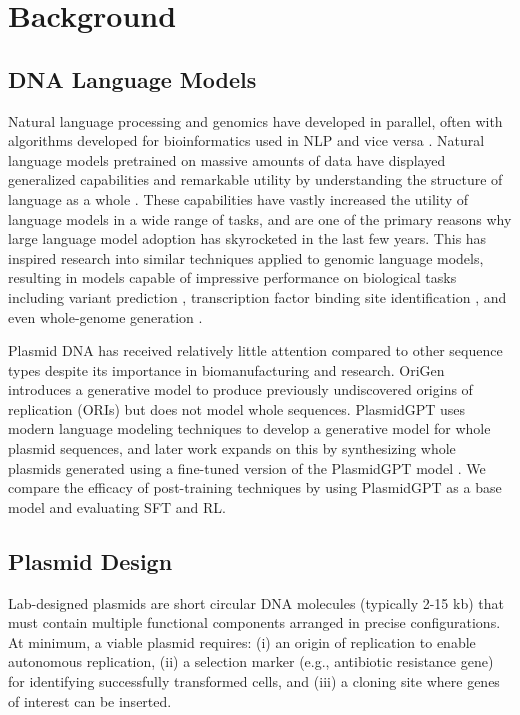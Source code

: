 \documentclass{article}
\theoremstyle{plain}
\theoremstyle{definition}
\theoremstyle{remark}
\begin{document}
\section{Background}

\subsection{DNA Language Models}

Natural language processing and genomics have developed in parallel,
often with algorithms developed for bioinformatics used in NLP and vice
versa \cite{durbin}. Natural language models pretrained on massive
amounts of data have displayed generalized capabilities and remarkable
utility by understanding the structure of language as a whole \cite{emergent_abilities_of_large_language_models}. 
These capabilities have vastly increased the utility of language models 
in a wide range of tasks, and are one of the primary reasons why 
large language model adoption has skyrocketed in the last few years.
This has inspired research into similar techniques applied to 
genomic language models, resulting in models capable of impressive performance on
biological tasks including variant prediction \cite{dnabert},
transcription factor binding site identification \cite{hyenadna}, and
even whole-genome generation \cite{evo}.

Plasmid DNA has received relatively little attention compared to other
sequence types despite its importance in biomanufacturing and 
research. OriGen \cite{origen} introduces a generative model to produce
previously undiscovered origins of replication (ORIs) but does not model
whole sequences. PlasmidGPT \cite{plasmidgpt, angus} uses modern language
modeling techniques to develop a generative model for whole plasmid
sequences, and later work expands on this by synthesizing whole plasmids
generated using a fine-tuned version of the PlasmidGPT model
\cite{angus}. We compare the efficacy of post-training techniques by
using PlasmidGPT as a base model and evaluating SFT and RL.

\subsection{Plasmid Design}

Lab-designed plasmids are short circular DNA molecules (typically 2-15
kb) that must contain multiple functional components arranged in precise
configurations. At minimum, a viable plasmid requires: (i) an origin of
replication to enable autonomous replication, (ii) a selection
marker (e.g., antibiotic resistance gene) for identifying successfully
transformed cells, and (iii) a cloning site where genes of interest can
be inserted.
\end{document}
